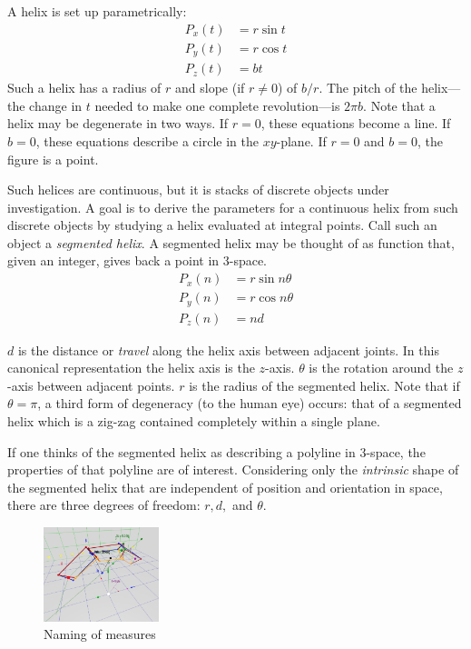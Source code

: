 \documentclass{svproc}
\begin{document}
A helix is set up parametrically:
\begin{align}
    P_x(t) &= r \sin{t}  \\
    P_y(t) &= r \cos{t} \\
   P_z(t) &= b t
\end{align}
Such a helix has a radius of $r$ and slope (if $r \neq 0$) of $b/r$.
The pitch of the helix---the change in $t$ needed to make one complete revolution---is $2\pi b$.
Note that a helix may be degenerate in two ways.
If $r = 0$, these equations become a line. If $b = 0$, these equations describe a circle in the $xy$-plane.
If $r = 0$ and $b = 0$, the figure is a point.

Such helices are continuous, but it is stacks of discrete objects under investigation.
A goal is to derive
the parameters for a continuous helix from such discrete objects by studying
a helix evaluated at integral points. Call such an object a {\em segmented helix}.
A segmented helix may be thought of as function that, given an integer, gives back a point in
3-space.
\begin{align}
    P_x(n) &= r \sin{n \theta}  \\
    P_y(n) &= r \cos{n \theta} \\
   P_z(n) &= n d
\end{align}

$d$ is the distance or {\em travel} along the helix axis between adjacent joints. In this canonical representation the helix axis is
the $z$-axis.
$\theta$ is the rotation around the $z$-axis
between adjacent points.
$r$ is the radius of the segmented helix.
Note that if $\theta = \pi$, a third form of degeneracy (to the human eye) occurs:
that of a segmented helix
which is a zig-zag contained completely within a single plane.

If one thinks of the segmented helix as describing a polyline in 3-space,
the properties of that polyline are of interest.
Considering only the {\em intrinsic} shape of the segmented helix that
are independent of position and orientation in space,
there are three degrees
of freedom: $r,d,$ and $\theta$.

\begin{figure}
     \centering
     \includegraphics[width=0.30\textwidth]{figures/ABCDFigure.png}
     \caption{Naming of measures}
  \label{fig:naming}
\end{figure}
\end{document}
